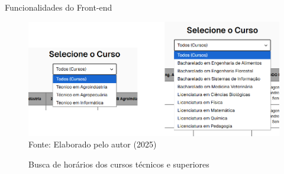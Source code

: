 \begin{frame}{Funcionalidades do Front-end}
    \begin{figure}
        \centering
        \vspace{-0.5cm}
        \caption{Busca de horários dos cursos técnicos e superiores}
        \vspace{-0.2cm}
        \includegraphics[width=1\textwidth]{figuras/front-17.png}
        \\ %
        \footnotesize Fonte: Elaborado pelo autor (2025)
    \end{figure}
\end{frame}

